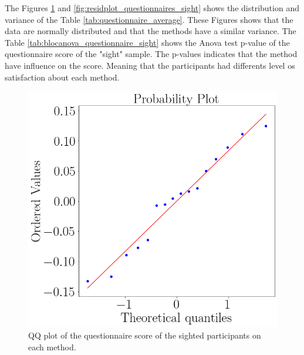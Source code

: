 

The Figures \ref{fig:qqplot_questionnaires_sight} and \ref{fig:residplot_questionnaires_sight} shows the distribution and variance of the Table \ref{tab:questionnaire_average}. These Figures shows that the data are normally distributed and that the methods have a similar variance.
The Table \ref{tab:blocanova_questionnaire_sight} shows the Anova test p-value of the questionnaire score of the "sight" sample. The p-values indicates that the method have influence on the score. Meaning that the participants had differents level os satisfaction about each method.



\begin{figure}[!htb]
    \centering
    \begin{minipage}{0.45\textwidth}
        \centering
        \includegraphics[width = 0.8\linewidth]{Resultados/Questionario/Figuras/png/qqplot_questionnaires_sight.png}
        \caption{QQ plot of the questionnaire score of the sighted participants on each method.}
        \label{fig:qqplot_questionnaires_sight}
    \end{minipage}
    \begin{minipage}{0.45\textwidth}
        \centering

\end{minipage}
\end{figure}
